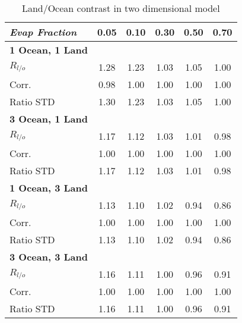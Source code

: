 \begin{center}
	\begin{table}[ht]
		\caption{Land/Ocean contrast in two dimensional model}
		\label{tab:tdm_Rlo}
		\scriptsize
	\begin{tabular}{ l  c  c  c  c  c }
		\hline
		\textit{Evap Fraction}	& 0.05  & 0.10 & 0.30  & 0.50  & 0.70 \\ \hline
		\textbf{1 Ocean, 1 Land}\\
		$R_{l/o}$ 					& 1.28  & 1.23 & 1.03  & 1.05 & 1.00\\ 
		Corr.					& 0.98  & 1.00 & 1.00  & 1.00 & 1.00\\ %
		Ratio STD          		& 1.30  & 1.23 & 1.03  & 1.05 & 1.00\\ \hline
		\textbf{3 Ocean, 1 Land}\\
		$R_{l/o}$ 					& 1.17  & 1.12 & 1.03  & 1.01 & 0.98\\ %
		Corr.					& 1.00  & 1.00 & 1.00  & 1.00 & 1.00\\ %
		Ratio STD          		& 1.17  & 1.12 & 1.03  & 1.01 & 0.98\\ \hline
		\textbf{1 Ocean, 3 Land}\\
		$R_{l/o}$ 					& 1.13  & 1.10 & 1.02  & 0.94 & 0.86\\ %
		Corr.					& 1.00  & 1.00 & 1.00  & 1.00 & 1.00\\ %
		Ratio STD          		& 1.13  & 1.10 & 1.02  & 0.94 & 0.86\\ \hline
		\textbf{3 Ocean, 3 Land}\\
		$R_{l/o}$ 					& 1.16  & 1.11 & 1.00  & 0.96 & 0.91\\ %
		Corr.					& 1.00  & 1.00 & 1.00  & 1.00 & 1.00\\ %
		Ratio STD          		& 1.16  & 1.11 & 1.00  & 0.96 & 0.91\\ \hline
	\end{tabular}
	\end{table}
\end{center}

